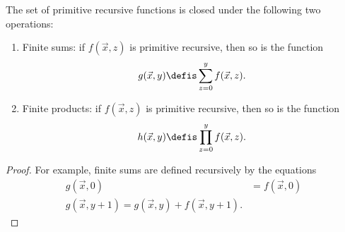 \documentclass[../../../include/open-logic-section]{subfiles}
\begin{document}
\begin{prop}
The set of primitive recursive functions is closed under the
following two operations:
\begin{enumerate}
\item Finite sums: if $f(\vec x, z)$ is primitive recursive, then so is the
function
\[
g(\vec x, y) \defis \sum_{z = 0}^y f(\vec x, z).
\]
\item Finite products: if $f(\vec x, z)$ is primitive recursive, then so is the
function
\[
h(\vec x, y) \defis \prod_{z = 0}^y f(\vec x, z).
\]
\end{enumerate}
\end{prop}

\begin{proof}
For example, finite sums are defined recursively by the equations
\begin{align*}
  g(\vec x, 0) & = f(\vec x, 0)\\
  g(\vec x, y+1) = g(\vec x, y) + f(\vec x, y+1).
\end{align*}
\end{proof}
\end{document}
